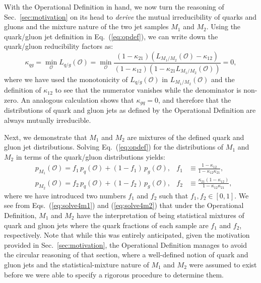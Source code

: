 \documentclass[letterpaper,11pt]{article}
\DeclareRobustCommand{\Sec}[1]{Sec.~\ref{#1}}
\DeclareRobustCommand{\Eq}[1]{Eq.~(\ref{#1})}
\DeclareRobustCommand{\Eqs}[2]{Eqs.~(\ref{#1}) and (\ref{#2})}
\renewcommand{\O}{\mathcal{O}}
\begin{document}
With the Operational Definition in hand, we now turn the reasoning of \Sec{sec:motivation} on its head to \emph{derive} the mutual irreducibility of quarks and gluons and the mixture nature of the two jet samples $M_1$ and $M_2$.
%
Using the quark/gluon jet definition in \Eq{eq:opdef}, we can write down the quark/gluon reducibility factors as:
\begin{equation}
\label{eq:derivekqgs}
\kappa_{qg}=\min_{\O}L_{q/g}(\O)=\min_{\O}\frac{(1-\kappa_{21})(L_{M_1/M_2}(\O)-\kappa_{12})}{(1-\kappa_{12})(1-\kappa_{21}L_{M_1/M_2}(\O))}=0,
\end{equation}
where we have used the monotonicity of $L_{q/g}(\mathcal O)$ in $L_{M_1/M_2}(\O)$ and the definition of $\kappa_{12}$ to see that the numerator vanishes while the denominator is non-zero.
%
An analogous calculation shows that $\kappa_{gq}=0$, and therefore that the distributions of quark and gluon jets as defined by the Operational Definition are always mutually irreducible.


Next, we demonstrate that $M_1$ and $M_2$ are mixtures of the defined quark and gluon jet distributions.
%
Solving \Eq{eq:opdef} for the distributions of $M_1$ and $M_2$ in terms of the quark/gluon distributions yields:
\begin{align}
\label{eq:solve4m1}
&p_{M_1}(\O)=f_1\, p_q(\O)+(1-f_1)\, p_g(\O),& f_1&\equiv\frac{1-\kappa_{12}}{1-\kappa_{12}\kappa_{21}},\\
&p_{M_2}(\O)=f_2 \, p_q(\O)+(1-f_2)\, p_g(\O),& f_2&\equiv\frac{\kappa_{21}(1-\kappa_{12})}{1-\kappa_{12}\kappa_{21}},
\label{eq:solve4m2}
\end{align}
where we have introduced two numbers $f_1$ and $f_2$ such that $f_1,f_2\in[0,1]$.
%
We see from \Eqs{eq:solve4m1}{eq:solve4m2} that under the Operational Definition, $M_1$ and $M_2$ have the interpretation of being statistical mixtures of quark and gluon jets where the quark fractions of each sample are $f_1$ and $f_2$, respectively.
%
Note that while this was entirely anticipated, given the motivation provided in \Sec{sec:motivation}, the Operational Definition manages to avoid the circular reasoning of that section, where a well-defined notion of quark and gluon jets and the statistical-mixture nature of $M_1$ and $M_2$ were assumed to exist before we were able to specify a rigorous procedure to determine them.
\end{document}
